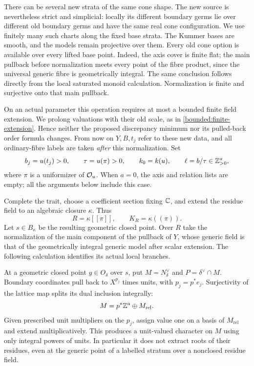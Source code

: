 There can be several new strata of the same cone shape.  The new
source is nevertheless strict and simplicial: locally its different
boundary germs lie over different old boundary germs and have the
same real cone configuration.  We use finitely many such charts
along the fixed base strata.  The Kummer bases are smooth, and the
models remain projective over them.  Every old cone option is
available over every lifted base point.  Indeed, the axis cover is
finite flat; the main pullback before normalization meets every
point of the fibre product, since the universal generic fibre is
geometrically integral.  The same conclusion follows directly from
the local saturated monoid calculation.  Normalization is finite
and surjective onto that main pullback.

On an actual parameter this operation requires at most a bounded
finite field extension.  We prolong valuations with their old
scale, as in \eqref{bounded:finite-extension}.  Hence neither the
proposed discrepancy minimum nor its pulled-back order formula
changes.  From now on \(Y,B,t_j\) refer to these new data, and all
ordinary-fibre labels are taken \emph{after} this normalization.
Set
\[
 b_j=u(t_j)>0,\qquad \tau=u(\pi)>0,\qquad
 k_0=k(u),\qquad \ell=b/\tau\in\mathbb Z_{>0}^a,
\]
where \(\pi\) is a uniformizer of \(\mathcal O_u\).  When \(a=0\), the
axis and relation lists are empty; all the arguments below include
this case.

Complete the trait, choose a coefficient section fixing \(\mathbb C\), and
extend the residue field to an algebraic closure \(\kappa\).  Thus
\[
 R=\kappa[[\pi]],\qquad K_R=\kappa((\pi)).
\]
Let \(s\in B_\kappa\) be the resulting geometric closed point.  Over
\(R\) take the normalization of the main component of the pullback
of \(Y\), whose generic field is that of the geometrically integral
generic model after scalar extension.  The following calculation
identifies its actual local branches.

At a geometric closed point \(y\in O_\delta\) over \(s\), put
\(M=N_\delta^\vee\) and \(P=\delta^\vee\cap M\).  Boundary
coordinates pull back to \(X^{p_j}\) times units, with
\(p_j=p^*e_j\).  Surjectivity of the lattice map splits its dual
inclusion integrally:
\begin{equation}
 M=p^*\mathbb Z^a\oplus M_{\mathrm{rel}}.
 \label{trait:primitive-splitting}
\end{equation}
Given prescribed unit multipliers on the \(p_j\), assign value one
on a basis of \(M_{\mathrm{rel}}\) and extend multiplicatively.
This produces a unit-valued character on \(M\) using only integral
powers of units.  In particular it does not extract roots of their
residues, even at the generic point of a labelled stratum over a
nonclosed residue field.

